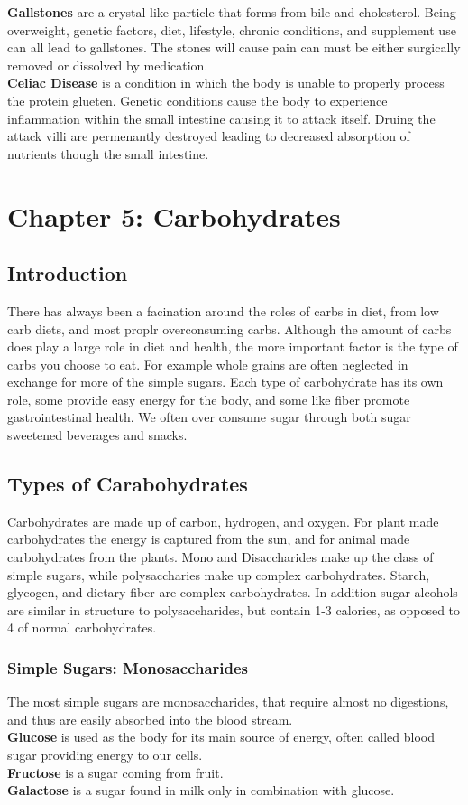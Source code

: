 \documentclass[letterpaper, 11pt]{article}
\begin{document}
\textbf{Gallstones} are a crystal-like particle that forms from bile and cholesterol. Being overweight, genetic factors, diet, lifestyle, chronic conditions, and supplement use can all lead to gallstones. The stones will cause pain can must be either surgically removed or dissolved by medication.\\
\textbf{Celiac Disease} is a condition in which the body is unable to properly process the protein glueten. Genetic conditions cause the body to experience inflammation within the small intestine causing it to attack itself. Druing the attack villi are permenantly destroyed leading to decreased absorption of nutrients though the small intestine.\\
\section{Chapter 5: Carbohydrates}
\label{sec:org00dfa14}
\subsection{Introduction}
\label{sec:org9c91c80}
There has always been a facination around the roles of carbs in diet, from low carb diets, and most proplr overconsuming carbs. Although the amount of carbs does play a large role in diet and health, the more important factor is the type of carbs you choose to eat. For example whole grains are often neglected in exchange for more of the simple sugars. Each type of carbohydrate has its own role, some provide easy energy for the body, and some like fiber promote gastrointestinal health. We often over consume sugar through both sugar sweetened beverages and snacks.\\
\subsection{Types of Carabohydrates}
\label{sec:orgfc41b29}
Carbohydrates are made up of carbon, hydrogen, and oxygen. For plant made carbohydrates the energy is captured from the sun, and for animal made carbohydrates from the plants. Mono and Disaccharides make up the class of simple sugars, while polysaccharies make up complex carbohydrates. Starch, glycogen, and dietary fiber are complex carbohydrates. In addition sugar alcohols are similar in structure to polysaccharides, but contain 1-3 calories, as opposed to 4 of normal carbohydrates.\\
\subsubsection{Simple Sugars: Monosaccharides}
\label{sec:org832c000}
The most simple sugars are monosaccharides, that require almost no digestions, and thus are easily absorbed into the blood stream.\\
\textbf{Glucose} is used as the body for its main source of energy, often called blood sugar providing energy to our cells.\\
\textbf{Fructose} is a sugar coming from fruit.\\
\textbf{Galactose} is a sugar found in milk only in combination with glucose.\\
\end{document}
